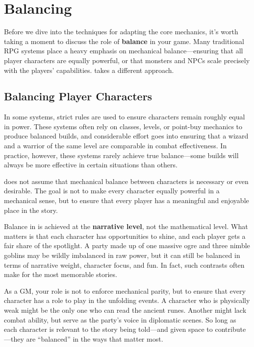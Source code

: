 \section{Balancing}

Before we dive into the techniques for adapting the core mechanics, it's worth taking a moment to discuss the role of \textbf{balance} in your game. Many traditional RPG systems place a heavy emphasis on mechanical balance—ensuring that all player characters are equally powerful, or that monsters and NPCs scale precisely with the players' capabilities. \wyrd takes a different approach.

\subsection{Balancing Player Characters}

In some systems, strict rules are used to ensure characters remain roughly equal in power. These systems often rely on classes, levels, or point-buy mechanics to produce balanced builds, and considerable effort goes into ensuring that a wizard and a warrior of the same level are comparable in combat effectiveness. In practice, however, these systems rarely achieve true balance—some builds will always be more effective in certain situations than others.

\wyrd does not assume that mechanical balance between characters is necessary or even desirable. The goal is not to make every character equally powerful in a mechanical sense, but to ensure that every player has a meaningful and enjoyable place in the story. 

Balance in \wyrd is achieved at the \textbf{narrative level}, not the mathematical level. What matters is that each character has opportunities to shine, and each player gets a fair share of the spotlight. A party made up of one massive ogre and three nimble goblins may be wildly imbalanced in raw power, but it can still be balanced in terms of narrative weight, character focus, and fun. In fact, such contrasts often make for the most memorable stories.

As a GM, your role is not to enforce mechanical parity, but to ensure that every character has a role to play in the unfolding events. A character who is physically weak might be the only one who can read the ancient runes. Another might lack combat ability, but serve as the party’s voice in diplomatic scenes. So long as each character is relevant to the story being told—and given space to contribute—they are “balanced” in the ways that matter most.

